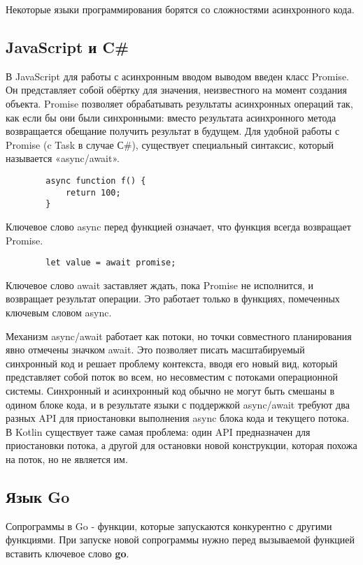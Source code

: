 	Некоторые языки программирования борятся со сложностями асинхронного кода.
	
	\subsection{JavaScript и C\#}
	В JavaScript для работы с асинхронным вводом выводом введен класс Promise.
	Он представляет собой обёртку для значения, неизвестного на момент создания объекта. 
	Promise позволяет обрабатывать результаты асинхронных операций так, как если бы они были синхронными:
	вместо результата асинхронного метода возвращается обещание получить результат в будущем.
	Для удобной работы с Promise (c Task в случае С\#), существует специальный синтаксис, который называется «async/await».
	
	\begin{lstlisting}
		async function f() {
			return 100;
		}
	\end{lstlisting}

	Ключевое слово async перед функцией означает, что функция всегда возвращает Promise.
	
	\begin{lstlisting}
		let value = await promise;
	\end{lstlisting}
	Ключевое слово await заставляет ждать, пока Promise не исполнится, и возвращает результат операции. Это работает только в функциях, помеченных ключевым словом async. 
	
	Механизм async/await работает как потоки, но точки совместного планирования явно отмечены значком
	await. Это позволяет писать масштабируемый синхронный код и решает проблему контекста, вводя
	его	новый вид, который представляет собой поток во всем, но несовместим с потоками операционной
	системы. Синхронный и асинхронный код обычно не могут быть смешаны в одином блоке кода, и в
	результате языки с поддержкой async/await требуют два разных API для приостановки выполнения async
	блока кода и текущего потока. В Kotlin существует таже самая проблема: один API предназначен для
	приостановки потока, а другой для остановки новой конструкции, которая похожа на поток, но не
	является им.
	
	\subsection{Язык Go}
	Сопрограммы в Go - функции, которые запускаются конкурентно с другими функциями. 
	При запуске новой сопрограммы нужно перед вызываемой функцией вставить ключевое слово \textbf{go}.
	
